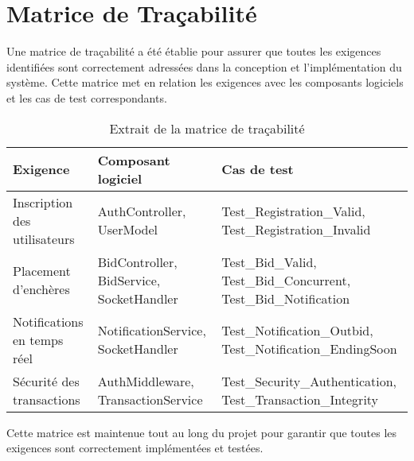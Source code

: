 \section{Matrice de Traçabilité}

Une matrice de traçabilité a été établie pour assurer que toutes les exigences identifiées sont correctement adressées dans la conception et l'implémentation du système. Cette matrice met en relation les exigences avec les composants logiciels et les cas de test correspondants.

\begin{table}[h]
\centering
\begin{tabular}{|p{4cm}|p{4cm}|p{4cm}|}
\hline
\textbf{Exigence} & \textbf{Composant logiciel} & \textbf{Cas de test} \\
\hline
Inscription des utilisateurs & AuthController,
UserModel & Test\_Registration\_Valid,
Test\_Registration\_Invalid \\
\hline
Placement d'enchères & BidController,
BidService,
SocketHandler & Test\_Bid\_Valid,
Test\_Bid\_Concurrent,
Test\_Bid\_Notification \\
\hline
Notifications en temps réel & NotificationService,
SocketHandler & Test\_Notification\_Outbid,
Test\_Notification\_EndingSoon \\
\hline
Sécurité des transactions & AuthMiddleware,
TransactionService & Test\_Security\_Authentication,
Test\_Transaction\_Integrity \\
\hline
\end{tabular}
\caption{Extrait de la matrice de traçabilité}
\label{table:traceability}
\end{table}

Cette matrice est maintenue tout au long du projet pour garantir que toutes les exigences sont correctement implémentées et testées. 